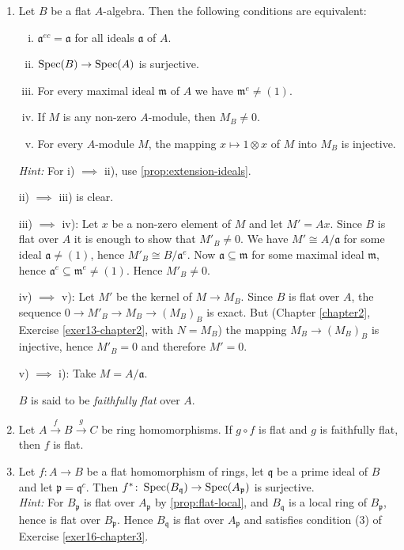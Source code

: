 \begin{enumerate}
    Deduce that every set of generators of $F$ has at least $n$ elements.

    \item \label{exer16-chapter3}Let $B$ be a flat $A$-algebra. Then the following conditions are equivalent:
    \begin{enumerate}[i)]
        \item $\mathfrak{a}^{ec} = \mathfrak{a}$ for all ideals $\mathfrak{a}$ of $A$.
        \item $\operatorname{Spec}(B) \to \operatorname{Spec}(A)$ is surjective.
        \item For every maximal ideal $\mathfrak{m}$ of $A$ we have $\mathfrak{m}^e \neq (1)$.
        \item If $M$ is any non-zero $A$-module, then $M_B \neq 0$.
        \item For every $A$-module $M$, the mapping $x \mapsto 1 \otimes x$ of $M$ into $M_B$ is injective.
    \end{enumerate}
    \textit{Hint:} For i) $\implies$ ii), use \eqref{prop:extension-ideals}. 
    
    ii) $\implies$ iii) is clear. 
    
    iii) $\implies$ iv): Let $x$ be a non-zero element of $M$ and let $M' = Ax$. Since $B$ is flat over $A$ it is enough to show that $M'_B \neq 0$. We have $M' \cong A/\mathfrak{a}$ for some ideal $\mathfrak{a} \neq (1)$, hence $M'_B \cong B/\mathfrak{a}^e$. Now $\mathfrak{a} \subseteq \mathfrak{m}$ for some maximal ideal $\mathfrak{m}$, hence $\mathfrak{a}^e \subseteq \mathfrak{m}^e \neq (1)$. Hence $M'_B \neq 0$. 
    
    iv) $\implies$ v): Let $M'$ be the kernel of $M \to M_B$. Since $B$ is flat over $A$, the sequence $0 \to M'_B \to M_B \to (M_B)_B$ is exact. But (Chapter \ref{chapter2}, Exercise \ref{exer13-chapter2}, with $N = M_B$) the mapping $M_B \to (M_B)_B$ is injective, hence $M'_B = 0$ and therefore $M' = 0$. 
    
    v) $\implies$ i): Take $M = A/\mathfrak{a}$.

    $B$ is said to be \emph{faithfully flat} over $A$.

    \item \label{exer17-chapter3}Let $A \xrightarrow{f} B \xrightarrow{g} C$ be ring homomorphisms. If $g \circ f$ is flat and $g$ is faithfully flat, then $f$ is flat.

    \item \label{exer18-chapter3}Let $f \colon A \to B$ be a flat homomorphism of rings, let $\mathfrak{q}$ be a prime ideal of $B$ and let $\mathfrak{p} = \mathfrak{q}^c$. Then $f^* \colon \operatorname{Spec}(B_{\mathfrak{q}}) \to \operatorname{Spec}(A_{\mathfrak{p}})$ is surjective.\\
    \textit{Hint:} For $B_{\mathfrak{p}}$ is flat over $A_{\mathfrak{p}}$ by \eqref{prop:flat-local}, and $B_{\mathfrak{q}}$ is a local ring of $B_{\mathfrak{p}}$, hence is flat over $B_{\mathfrak{p}}$. Hence $B_{\mathfrak{q}}$ is flat over $A_{\mathfrak{p}}$ and satisfies condition (3) of Exercise \ref{exer16-chapter3}.


\end{enumerate}
